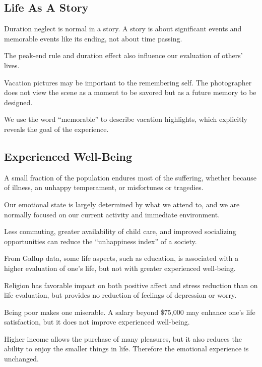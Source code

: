 \subsection*{Life As A Story}

\bit
\item Duration neglect is normal in a story. A story is about significant events and memorable events like its
ending, not about time passing.
\item The peak-end rule and duration effect also influence our evaluation of others' lives.
\item Vacation pictures may be important to the remembering self. The photographer does not view the scene as a
moment to be savored but as a future memory to be designed.
\item We use the word ``memorable'' to describe vacation highlights, which explicitly reveals the goal of the
experience.
\eit

\subsection*{Experienced Well-Being}

\bit
\item A small fraction of the population endures most of the suffering, whether because of illness, an unhappy
temperament, or misfortunes or tragedies.
\item Our emotional state is largely determined by what we attend to, and we are normally focused on our current
activity and immediate environment.
\item Less commuting, greater availability of child care, and improved socializing opportunities can reduce the
``unhappiness index'' of a society.
\item From Gallup data, some life aspects, such as education, is associated with a higher evaluation of one's life,
but not with greater experienced well-being.
\item Religion has favorable impact on both positive affect and stress reduction than on life evaluation, but
provides no reduction of feelings of depression or worry.
\item Being poor makes one miserable. A salary beyond \$75,000 may enhance one's life satisfaction, but it does not
improve experienced well-being.
\item Higher income allows the purchase of many pleasures, but it also reduces the ability to enjoy the smaller
things in life. Therefore the emotional experience is unchanged.
\eit

